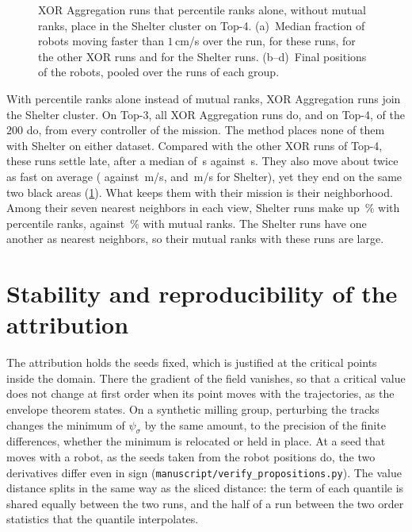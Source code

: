 \begin{figure}[!htbp]
\centering
{}
\caption{XOR Aggregation runs that percentile ranks alone, without mutual ranks, place in the Shelter cluster on
Top-4. (a)~Median fraction of robots
moving faster than $1$\,cm/s over the run, for these runs, for the other XOR runs and for the Shelter
runs. (b--d)~Final positions of the robots, pooled over the runs of each group.}
\label{fig:merge}
\end{figure}

With percentile ranks alone instead of mutual ranks, XOR Aggregation runs join the Shelter cluster. On Top-3, all
 XOR Aggregation runs do, and on Top-4,  of the $200$ do, from every controller of the
mission. The method places none of them with Shelter on either dataset. Compared with the other XOR runs of Top-4, these
runs settle late, after a median of \,s against \,s. They also move
about twice as fast on average ( against \,m/s, and
\,m/s for Shelter), yet they end on the same two black areas (\cref{fig:merge}). What keeps them
with their mission is their neighborhood. Among their seven nearest neighbors in each view, Shelter runs make up
\,\% with percentile ranks, against \,\% with mutual ranks. The Shelter runs
have one another as nearest neighbors, so their mutual ranks with these runs are large.

\section{Stability and reproducibility of the attribution}
\label{app:attribution}

The attribution holds the seeds fixed, which is justified at the critical points inside the domain.
There the gradient of the field vanishes, so that a critical value does not change at first order when
its point moves with the trajectories, as the envelope theorem states. On a synthetic milling group,
perturbing the tracks changes the minimum of $\psi_\sigma$ by the same amount, to the precision of the
finite differences, whether the minimum is relocated or held in place. At a seed that
moves with a robot, as the seeds taken from the robot positions do, the two derivatives differ even in sign
(\nolinkurl{manuscript/verify_propositions.py}). The value distance splits in the same way as the sliced
distance: the term of each quantile is shared equally between the two runs, and the half of a run between the two
order statistics that the quantile interpolates.

